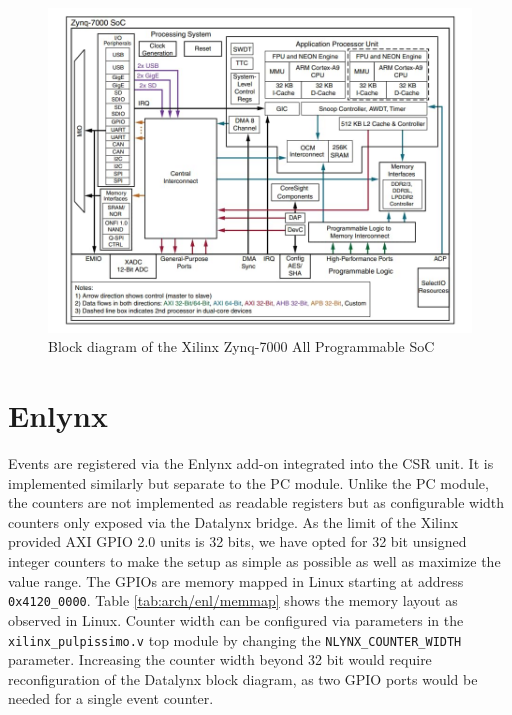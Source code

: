\documentclass[../bachelor_paper.tex]{subfiles}
\begin{document}
\begin{figure}
    \centering
    \includegraphics[width=1\columnwidth]{img/zynq_block}
    \caption{Block diagram of the Xilinx Zynq-7000 All Programmable \ac{SoC} \cite{Zynq7000SoC}}
    \label{fig:arch/comm/zynq}
\end{figure}

\section{Enlynx}
    \label{sec:arch/enlynx}
Events are registered via the Enlynx add-on integrated into the \ac{CSR} unit. It is implemented similarly but separate to the \ac{PC} module. Unlike the \ac{PC} module, the counters are not implemented as readable registers but as configurable width counters only exposed via the Datalynx bridge. As the limit of the Xilinx provided AXI GPIO 2.0 units is 32 bits, we have opted for 32 bit unsigned integer counters to make the setup as simple as possible as well as maximize the value range. The GPIOs are memory mapped in Linux starting at address \texttt{0x4120\_0000}. Table \ref{tab:arch/enl/memmap} shows the memory layout as observed in Linux. Counter width can be configured via parameters in the \texttt{xilinx\_pulpissimo.v} top module by changing the \texttt{NLYNX\_COUNTER\_WIDTH} parameter. Increasing the counter width beyond 32 bit would require reconfiguration of the Datalynx block diagram, as two GPIO ports would be needed for a single event counter.
\end{document}

